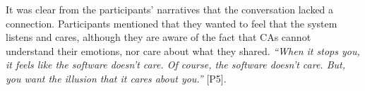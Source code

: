         It was clear from the participants' narratives that the conversation lacked a connection. Participants mentioned that they wanted to feel that the system listens and cares, although they are aware of the fact that \acp{CA} cannot understand their emotions, nor care about what they shared.
                \textit{
                ``When it stops you, it feels like the software doesn't care. Of course, the software doesn't care. But, you want the illusion that it cares about you.''}
                [P5].


